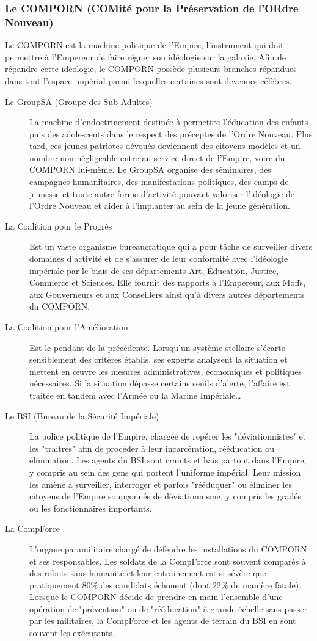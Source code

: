 \documentclass[twoside]{article}
\begin{document}
\subsubsection{Le COMPORN (COMité pour la Préservation de l'ORdre Nouveau)}
Le COMPORN est la machine politique de l'Empire, l'instrument qui doit permettre à l'Empereur de faire régner son idéologie sur la galaxie. Afin de répandre cette idéologie, le COMPORN possède plusieurs branches répandues dans tout l'espace impérial parmi lesquelles certaines sont devenues célèbres. 
\begin{description}
	\item[Le GroupSA (Groupe des Sub-Adultes)] La machine d'endoctrinement destinée à permettre l'éducation des enfants puis des adolescents dans le respect des préceptes de l'Ordre Nouveau. Plus tard, ces jeunes patriotes dévoués deviennent des citoyens modèles et un nombre non négligeable entre au service direct de l'Empire, voire du COMPORN lui-même. Le GroupSA organise des séminaires, des campagnes humanitaires, des manifestations politiques, des camps de jeunesse et toute autre forme d'activité pouvant valoriser l'idéologie de l'Ordre Nouveau et aider à l'implanter au sein de la jeune génération.
	\item[La Coalition pour le Progrès] Est un vaste organisme bureaucratique qui a pour tâche de surveiller divers domaines d'activité et de s'assurer de leur conformité avec l'idéologie impériale par le biais de ses départements Art, Éducation, Justice, Commerce et Sciences. Elle fournit des rapports à l'Empereur, aux Moffs, aux Gouverneurs et aux Conseillers ainsi qu'à divers autres départements du COMPORN.
	\item[La Coalition pour l'Amélioration] Est le pendant de la précédente. Lorsqu’un système stellaire s'écarte sensiblement des critères établis, ses experts analysent la situation et mettent en \oe uvre les mesures administratives, économiques et politiques nécessaires. Si la situation dépasse certains seuils d'alerte, l'affaire est traitée en tandem avec l'Armée ou la Marine Impériale\ldots
	\item[Le BSI (Bureau de la Sécurité Impériale)] La police politique de l'Empire, chargée de repérer les "déviationnistes" et les "traitres" afin de procéder à leur incarcération, rééducation ou élimination. Les agents du BSI sont craints et hais partout dans l'Empire, y compris au sein des gens qui portent l'uniforme impérial. Leur mission les amène à surveiller, interroger et parfois "rééduquer" ou éliminer les citoyens de l'Empire soupçonnés de déviationnisme, y compris les gradés ou les fonctionnaires importants.
	\item[La CompForce] L'organe paramilitaire chargé de défendre les installations du COMPORN et ses responsables. Les soldats de la CompForce sont souvent comparés à des robots sans humanité et leur entrainement est si sévère que pratiquement 80\% des candidats échouent (dont 22\% de manière fatale). Lorsque le COMPORN décide de prendre en main l'ensemble d'une opération de "prévention" ou de "rééducation" à grande échelle sans passer par les militaires, la CompForce et les agents de terrain du BSI en sont souvent les exécutants.
\end{description}
\end{document}
